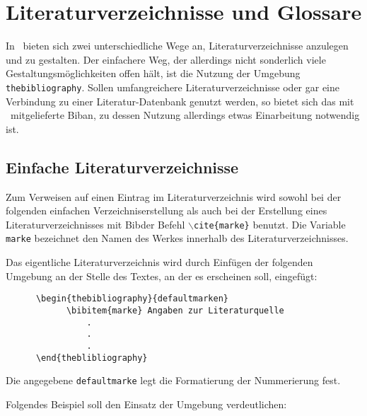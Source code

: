
%

\chapter{Literaturverzeichnisse und Glossare}
\label{sec:literaturverzeichnisse}

In \DMLLaTeX \ bieten sich zwei unterschiedliche Wege an, Literaturverzeichnisse
anzulegen und zu gestalten. Der einfachere Weg, der allerdings nicht sonderlich
viele Gestaltungsmöglichkeiten offen hält, ist die Nutzung der Umgebung \texttt{thebibliography}. Sollen umfangreichere Literaturverzeichnisse oder gar eine Verbindung zu einer Literatur-Datenbank genutzt werden, so
bietet sich das mit \DMLLaTeX \ mitgelieferte Bib\DMLTeX an, zu dessen Nutzung allerdings etwas Einarbeitung notwendig ist.

\section{Einfache Literaturverzeichnisse}

Zum Verweisen auf einen Eintrag im Literaturverzeichnis wird sowohl bei der folgenden
einfachen Verzeichniserstellung als auch bei der Erstellung eines Literaturverzeichnisses
mit Bib\DMLTeX der Befehl \texttt{$\backslash$cite\{marke\}} benutzt. Die Variable
\texttt{marke} bezeichnet den Namen des Werkes innerhalb des Literaturverzeichnisses.

Das eigentliche Literaturverzeichnis wird durch Einfügen der folgenden Umgebung an der
Stelle des Textes, an der es erscheinen soll, eingefügt:

\begin{verbatim}
      \begin{thebibliography}{defaultmarken}
            \bibitem{marke} Angaben zur Literaturquelle
                .
                .
                .
      \end{theblibliography}
\end{verbatim}

Die angegebene \texttt{defaultmarke} legt die Formatierung der Nummerierung fest.
\newpage

Folgendes Beispiel soll den Einsatz der Umgebung verdeutlichen:

